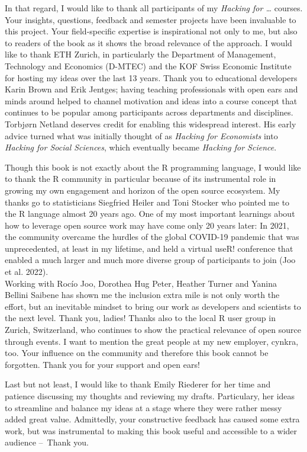 \documentclass[
  12pt,
  letterpaper,
]{krantz}
\begin{document}
In that regard, I would like to thank all participants of my
\emph{Hacking for \ldots{}} courses. Your insights, questions, feedback
and semester projects have been invaluable to this project. Your
field-specific expertise is inspirational not only to me, but also to
readers of the book as it shows the broad relevance of the approach. I
would like to thank ETH Zurich, in particularly the Department of
Management, Technology and Economics (D-MTEC) and the KOF Swiss Economic
Institute for hosting my ideas over the last 13 years. Thank you to
educational developers Karin Brown and Erik Jentges; having teaching
professionals with open ears and minds around helped to channel
motivation and ideas into a course concept that continues to be popular
among participants across departments and disciplines. Torbjørn Netland
deserves credit for enabling this widespread interest. His early advice
turned what was initially thought of as \emph{Hacking for Economists}
into \emph{Hacking for Social Sciences}, which eventually became
\emph{Hacking for Science}.

Though this book is not exactly about the R programming language, I
would like to thank the R community in particular because of its
instrumental role in growing my own engagement and horizon of the open
source ecosystem. My thanks go to statisticians Siegfried Heiler and
Toni Stocker who pointed me to the R language almost 20 years ago. One
of my most important learnings about how to leverage open source work
may have come only 20 years later: In 2021, the community overcame the
hurdles of the global COVID-19 pandemic that was unprecedented, at least
in my lifetime, and held a virtual useR! conference that enabled a much
larger and much more diverse group of participants to join (Joo et al.
2022).\\
Working with Rocío Joo, Dorothea Hug Peter, Heather Turner and Yanina
Bellini Saibene has shown me the inclusion extra mile is not only worth
the effort, but an inevitable mindset to bring our work as developers
and scientists to the next level. Thank you, ladies! Thanks also to the
local R user group in Zurich, Switzerland, who continues to show the
practical relevance of open source through events. I want to mention the
great people at my new employer, cynkra, too. Your influence on the
community and therefore this book cannot be forgotten. Thank you for
your support and open ears!

Last but not least, I would like to thank Emily Riederer for her time
and patience discussing my thoughts and reviewing my drafts.
Particulary, her ideas to streamline and balance my ideas at a stage
where they were rather messy added great value. Admittedly, your
constructive feedback has caused some extra work, but was instrumental
to making this book useful and accessible to a wider audience --~Thank
you.
\end{document}
